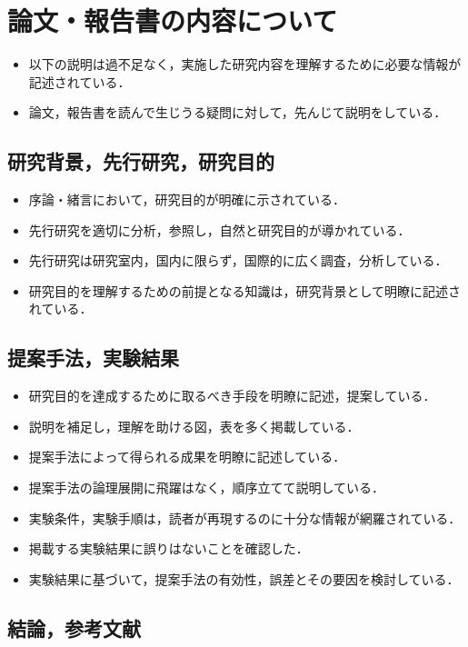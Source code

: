 \documentclass[a4paper,11pt,dvipdfmx]{jlreq}
\begin{document}
\section{論文・報告書の内容について}

\begin{itemize}
 \item 以下の説明は過不足なく，実施した研究内容を理解するために必要な情報が記述されている．
 \item 論文，報告書を読んで生じうる疑問に対して，先んじて説明をしている．
\end{itemize}

\subsection{研究背景，先行研究，研究目的}
\begin{itemize}
 \item 序論・緒言において，研究目的が明確に示されている．
 \item 先行研究を適切に分析，参照し，自然と研究目的が導かれている．
 \item 先行研究は研究室内，国内に限らず，国際的に広く調査，分析している．
 \item 研究目的を理解するための前提となる知識は，研究背景として明瞭に記述されている．
\end{itemize}

\subsection{提案手法，実験結果}

\begin{itemize}
 \item 研究目的を達成するために取るべき手段を明瞭に記述，提案している．
 \item 説明を補足し，理解を助ける図，表を多く掲載している． 
 \item 提案手法によって得られる成果を明瞭に記述している．
 \item 提案手法の論理展開に飛躍はなく，順序立てて説明している．
 \item 実験条件，実験手順は，読者が再現するのに十分な情報が網羅されている．
 \item 掲載する実験結果に誤りはないことを確認した．
 \item 実験結果に基づいて，提案手法の有効性，誤差とその要因を検討している．
\end{itemize}


\subsection{結論，参考文献}
\end{document}
